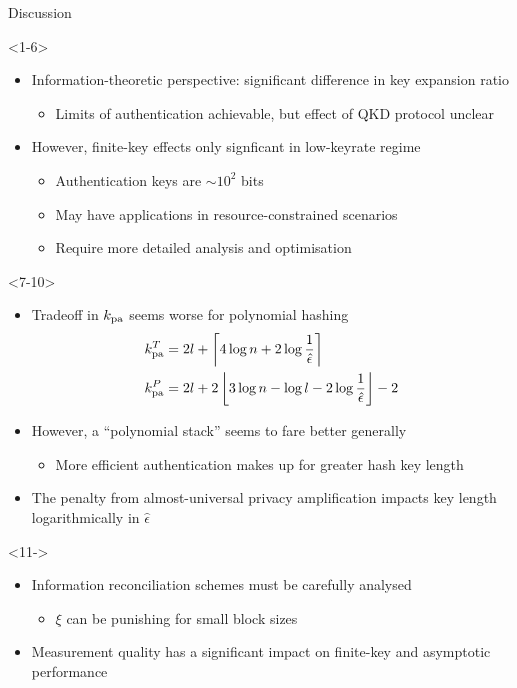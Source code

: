 \documentclass[xcolor=dvipsnames]{beamer}
\newcommand{\?}{\mathrel{?}} %
\newcommand{\ceil}[1]{\left\lceil#1\right\rceil} %
\newcommand{\floor}[1]{\left\lfloor#1\right\rfloor} %
\newcommand{\pa}{\rm pa}
\begin{document}
\begin{frame}{Discussion}
  \begin{onlyenv}<1-6>
    \begin{itemize}[<+->]
      \item Information-theoretic perspective: significant difference in key expansion ratio
        \begin{itemize}
          \item Limits of authentication achievable, but effect of QKD protocol unclear
        \end{itemize}
      \item However, finite-key effects only signficant in low-keyrate regime
        \begin{itemize}
          \item Authentication keys are \(\sim 10^2\) bits
          \item May have applications in resource-constrained scenarios
          \item Require more detailed analysis and optimisation
        \end{itemize}
    \end{itemize}
  \end{onlyenv}
  \begin{onlyenv}<7-10>
    \begin{itemize}[<+->]
      \item Tradeoff in \(k_{\pa}\) seems worse for polynomial hashing
        \begin{align*}
          k_{\pa}^T &= 2l + \ceil{ 4\log n + 2\log \frac{1}{\hat{\epsilon}} } \\
          k_{\pa}^P &= 2l + 2\floor{ 3 \log n - \log l - 2\log \frac{1}{\hat{\epsilon}} } - 2
        \end{align*}
      \item However, a ``polynomial stack'' seems to fare better generally
        \begin{itemize}
          \item More efficient authentication makes up for greater hash key length
        \end{itemize}
      \item The penalty from almost-universal privacy amplification impacts key length logarithmically in \(\hat{\epsilon}\)
    \end{itemize}
  \end{onlyenv}
  \begin{onlyenv}<11->
    \begin{itemize}[<+->]
      \item Information reconciliation schemes must be carefully analysed
        \begin{itemize}
          \item \(\xi\) can be punishing for small block sizes
        \end{itemize}
      \item Measurement quality has a significant impact on finite-key and asymptotic performance
    \end{itemize}
  \end{onlyenv}
\end{frame}
\end{document}
